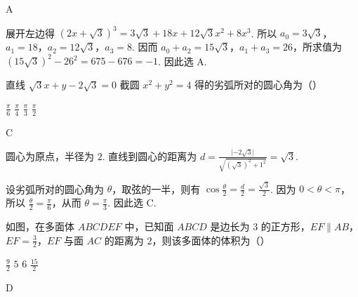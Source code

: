 \documentclass[UTF8,a4paper,oneside,11pt]{ctexbook}
\begin{document}
\begin{answer}
A
\end{answer}

\begin{solution}
展开左边得
\((2x+\sqrt3)^3=3\sqrt3+18x+12\sqrt3x^2+8x^3\).
所以 \(a_0=3\sqrt3\)，\(a_1=18\)，\(a_2=12\sqrt3\)，\(a_3=8\). 因而
\(a_0+a_2=15\sqrt3\)，\(a_1+a_3=26\)，所求值为
\((15\sqrt3)^2-26^2=675-676=-1\).
因此选 A.
\end{solution}

\begin{problem}
直线 \(\sqrt{3}x+y-2\sqrt{3}=0\) 截圆 \(x^2+y^2=4\) 得的劣弧所对的圆心角为（\quad）

\choices
    {\(\frac{\pi}{6}\)}
    {\(\frac{\pi}{4} \)}
    {\(\frac{\pi}{3} \)}
    {\(\frac{\pi}{2} \)}
\end{problem}

\begin{answer}
C
\end{answer}

\begin{solution}
圆心为原点，半径为 \(2\). 直线到圆心的距离为
\(d=\frac{\lvert-2\sqrt3\rvert}{\sqrt{(\sqrt3)^2+1^2}}=\sqrt3\).

设劣弧所对的圆心角为 \(\theta\)，取弦的一半，则有
\(\cos\frac\theta2=\frac d2=\frac{\sqrt3}{2}\). 因为 \(0<\theta<\pi\)，所以 \(\frac\theta2=\frac\pi6\)，从而 \(\theta=\frac\pi3\). 因此选 C.
\end{solution}

\begin{problem}
如图，在多面体 \(ABCDEF\) 中，已知面 \(ABCD\) 是边长为 \(3\) 的正方形，\(EF\parallel AB\)，\(EF = \frac{3}{2}\)，\(EF\) 与面 \(AC\) 的距离为 \(2\)，则该多面体的体积为（\quad）


\choices
    {\(\frac{9}{2}\)}
    {\(5\)}
    {\(6\)}
    {\(\frac{15}{2}\)}
\end{problem}

\begin{answer}
D
\end{answer}
\end{document}
